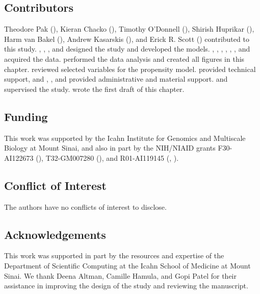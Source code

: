 \subsection*{Contributors}

Theodore Pak (), Kieran Chacko (), Timothy O'Donnell (), Shirish Huprikar (), Harm van Bakel (), Andrew Kasarskis (), and Erick R. Scott () contributed to this study. , , , and  designed the study and developed the models. , , , , , , and  acquired the data.  performed the data analysis and created all figures in this chapter.  reviewed selected variables for the propensity model.  provided technical support, and , , and  provided administrative and material support.  and  supervised the study.  wrote the first draft of this chapter.

\subsection*{Funding}

This work was supported by the Icahn Institute for Genomics and Multiscale Biology at Mount Sinai, and also in part by the NIH/NIAID grants F30-AI122673 (), T32-GM007280 (), and R01-AI119145 (, ).

\subsection*{Conflict of Interest}

The authors have no conflicts of interest to disclose.

\subsection*{Acknowledgements}

This work was supported in part by the resources and expertise of the Department of Scientific Computing at the Icahn School of Medicine at Mount Sinai. We thank Deena Altman, Camille Hamula, and Gopi Patel for their assistance in improving the design of the study and reviewing the manuscript.